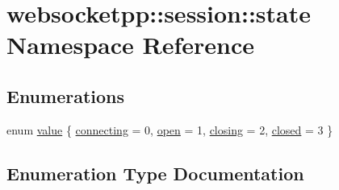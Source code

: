 \hypertarget{namespacewebsocketpp_1_1session_1_1state}{}\section{websocketpp\+:\+:session\+:\+:state Namespace Reference}
\label{namespacewebsocketpp_1_1session_1_1state}
\subsection*{Enumerations}
\begin{DoxyCompactItemize}
\item 
enum \hyperlink{namespacewebsocketpp_1_1session_1_1state_a12acca56cdb6c10f467dfb10fc763ca5}{value} \{ \hyperlink{namespacewebsocketpp_1_1session_1_1state_a12acca56cdb6c10f467dfb10fc763ca5a5d6a70f93d03d19c53ad5f4c4b3a176f}{connecting} = 0, 
\hyperlink{namespacewebsocketpp_1_1session_1_1state_a12acca56cdb6c10f467dfb10fc763ca5a90d929cb6e119645ec2800451bfdc0a0}{open} = 1, 
\hyperlink{namespacewebsocketpp_1_1session_1_1state_a12acca56cdb6c10f467dfb10fc763ca5a646a22eb6d8f0b3f6e032fc27dc1091e}{closing} = 2, 
\hyperlink{namespacewebsocketpp_1_1session_1_1state_a12acca56cdb6c10f467dfb10fc763ca5afff87406dd6d9c5d93c993c3e225a8bc}{closed} = 3
 \}
\end{DoxyCompactItemize}


\subsection{Enumeration Type Documentation}
\hypertarget{namespacewebsocketpp_1_1session_1_1state_a12acca56cdb6c10f467dfb10fc763ca5}{}
